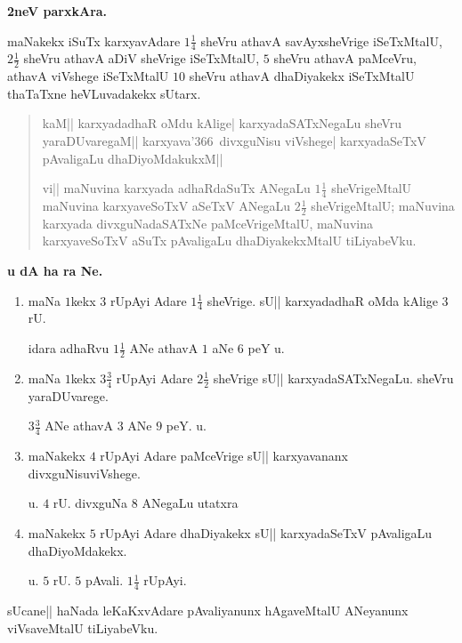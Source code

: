 \medskip

\begin{center}
{\large\bf 2neV parxkAra.}
\end{center}

maNakekx iSuTx karxyavAdare $1\frac{1}{4}$ sheVru athavA savAyxsheVrige iSeTxMtalU, $2\frac{1}{2}$ sheVru athavA aDiV sheVrige iSeTxMtalU, $5$ sheVru athavA paMceVru, athavA viVshege iSeTxMtalU $10$ sheVru athavA dhaDiyakekx iSeTxMtalU thaTaTxne heVLuvadakekx sUtarx.

\begin{verse}
kaM|| karxyadadhaR oMdu kAlige| karxyadaSATxNegaLu sheVru yaraDUvaregaM||
karxyava\char'366\ divxguNisu viVshege| karxyadaSeTxV pAvaligaLu dhaDiyoMdakukxM||

vi|| maNuvina karxyada adhaRdaSuTx ANegaLu $1\frac{1}{4}$ sheVrigeMtalU  maNuvina karxyaveSoTxV aSeTxV ANegaLu $2\frac{1}{2}$ sheVrigeMtalU; maNuvina karxyada divxguNadaSATxNe paMceVrigeMtalU, maNuvina karxyaveSoTxV aSuTx pAvaligaLu dhaDiyakekxMtalU tiLiyabeVku.
\end{verse}

\begin{center}
{\large\bf u dA ha ra Ne.}
\end{center}

\begin{enumerate}[\rm(1)]
\item maNa $1$kekx $3$ rUpAyi Adare $1\frac{1}{4}$ sheVrige. sU|| karxyadadhaR oMda kAlige $3$ rU. 

idara adhaRvu $1\frac{1}{2}$ ANe athavA $1$ aNe $6$ peY u.

\item maNa $1$kekx $3\frac{3}{4}$ rUpAyi Adare $2\frac{1}{2}$ sheVrige sU|| karxyadaSATxNegaLu. sheVru yaraDUvarege. 

$3\frac{3}{4}$ ANe athavA $3$ ANe $9$ peY. u.

\item maNakekx $4$ rUpAyi Adare paMceVrige sU|| karxyavananx divxguNisuviVshege. 

\hfill u. $4$ rU. divxguNa $8$ ANegaLu utatxra

\item maNakekx $5$ rUpAyi Adare dhaDiyakekx sU|| karxyadaSeTxV pAvaligaLu dhaDiyoMdakekx. 

\hfill u. $5$ rU. $5$ pAvali. $1\frac{1}{4}$ rUpAyi.
\end{enumerate}

sUcane|| haNada leKaKxvAdare pAvaliyanunx hAgaveMtalU ANeyanunx viVsaveMtalU tiLiyabeVku.\\

